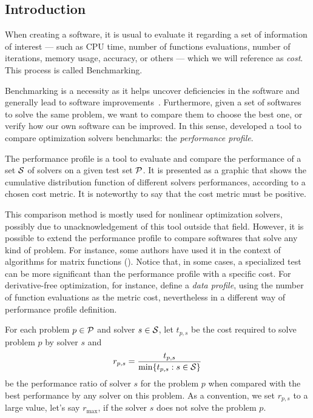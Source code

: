 \subsection*{Introduction}

    When creating a software, it is usual to evaluate it regarding a set of
    information of interest
    --- such as CPU time, number of
    functions evaluations, number of iterations, memory usage, accuracy, or
    others --- which we will
    reference as \emph{cost}. This process is called Benchmarking.

    Benchmarking is a necessity as it
    helps uncover deficiencies in the software and generally lead
    to software
    improvements~\cite{url:mittelmann,Mittelmann:1999fb,Dolan:2006kl}.
    Furthermore, given a set of softwares to solve the same problem, we want to
    compare them to choose the best one, or verify how our own software can be
    improved.
    In this sense, \textcite{Dolan:2002du} developed a tool to compare
    optimization solvers benchmarks: the \emph{performance profile}.

    The performance profile is a tool to evaluate and compare the performance
    of a set $\mathcal{S}$ of solvers  on a given test set $\mathcal{P}$. It is presented as
    a graphic that shows the cumulative distribution function of different 
    solvers performances, according to a chosen cost metric.
    It is noteworthy to say that the cost metric must be positive.

    This comparison method is mostly used for nonlinear optimization solvers, 
    possibly due to unacknowledgement of this tool outside that
    field.
    However, it is possible to extend the performance profile to compare
    softwares that solve any kind of problem.
    For instance, some authors have used it in the context of algorithms for
    matrix functions (\cite{al-mohy:2009, al-mohy:2011, al-mohy:2012,
    higham:2005, higham:2009, higham:2011, higham:2013}).
    Notice that, in some cases, a
    specialized test can be more significant than the performance profile with
    a specific cost.  For derivative-free optimization, for instance,
    \textcite{More:2009benchmarking} define a \emph{data profile}, using the
    number of function evaluations as the metric cost, nevertheless in a 
    different way of performance profile definition.

    For each
    problem $p \in \mathcal{P}$ and solver $s \in \mathcal{S}$, let $t_{p,s}$ be the
    cost required to solve problem $p$ by solver $s$ and
    \begin{align*}
      r_{p,s} = \frac{t_{p,s}}{\min\{t_{p,s}: s \in \mathcal{S}\}}
    \end{align*}
    be the performance ratio of solver $s$ for the problem $p$ when compared
    with the best performance by any solver on this problem.
    As a convention, we set $r_{p,s}$ to a large value, let's say $r_{\max}$, if
    the solver $s$ does not solve the problem $p$.

